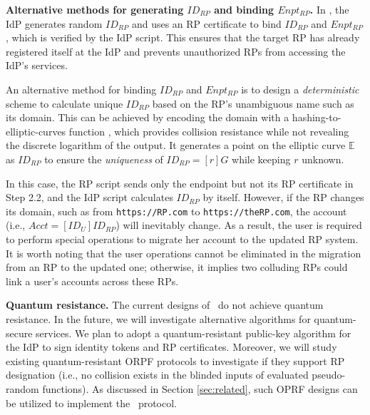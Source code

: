 \noindent \textbf{Alternative methods for generating $ID_{RP}$ and binding $Enpt_{RP}$.}
In \usso, the IdP generates random $ID_{RP}$ and uses an RP certificate to bind $ID_{RP}$ and $Enpt_{RP}$, which is verified by the IdP script. This ensures that the target RP has already registered itself at the IdP and prevents unauthorized RPs from accessing the IdP's services.

An alternative method for binding $ID_{RP}$ and $Enpt_{RP}$ is
 to design a \emph{deterministic} scheme to calculate unique $ID_{RP}$ based on the RP's unambiguous name such as its domain.
This can be achieved by encoding the domain with a hashing-to-elliptic-curves function \cite{irtf-cfrg-hash-to-curve-16}, which provides collision resistance while not revealing the discrete logarithm of the output. It generates a point on the elliptic curve $\mathbb{E}$ as $ID_{RP}$ to ensure the \emph{uniqueness} of $ID_{RP} = [r]G$ while keeping $r$ unknown. %

In this case, the RP script sends only the endpoint but not its RP certificate in Step 2.2, and the IdP script calculates $ID_{RP}$ by itself. %
However, if the RP changes its domain, such as from \verb+https://RP.com+ to \verb+https://theRP.com+, the account (i.e., $Acct = [ID_U]ID_{RP}$) will inevitably change.
As a result, the user is required to perform special operations to migrate her account to the updated RP system.
It is worth noting that the user operations cannot be eliminated in the migration from an RP to the updated one;
otherwise, it implies two colluding RPs could link a user's accounts across these RPs.

\newc
\noindent \textbf{Quantum resistance.}
The current designs of \usso\ do not achieve quantum resistance.
In the future, we will investigate alternative algorithms for quantum-secure services.
We plan to adopt a quantum-resistant public-key algorithm for the IdP to sign identity tokens and RP certificates.
Moreover, we will study existing quantum-resistant ORPF protocols \cite{ideal-lattice-oprf,isogency-oprf}
 to investigate if they support RP designation (i.e., no collision exists in the blinded inputs of evaluated pseudo-random functions).
As discussed in Section \ref{sec:related}, such OPRF designs can be utilized to implement the \usso\ protocol.

